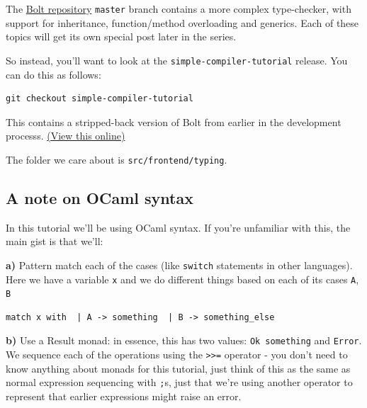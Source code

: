 {{The \href{https://github.com/mukul-rathi/bolt}{Bolt repository}
\texttt{master} branch contains a more complex type-checker, with
support for inheritance, function/method overloading and generics. Each
of these topics will get its own special post later in the series.

So instead, you'll want to look at the \texttt{simple-compiler-tutorial}
release. You can do this as follows:


\begin{verbatim}
git checkout simple-compiler-tutorial
\end{verbatim}

This contains a stripped-back version of Bolt from earlier in the
development processs.
\href{https://github.com/mukul-rathi/bolt/tree/simple-compiler-tutorial}{(View
this online)}

The folder we care about is \texttt{src/frontend/typing}.

\hypertarget{a-note-on-ocaml-syntax}{%
\subsection{\texorpdfstring{\protect\hyperlink{a-note-on-ocaml-syntax}{}A
note on OCaml
syntax}{A note on OCaml syntax}}\label{a-note-on-ocaml-syntax}}

In this tutorial we'll be using OCaml syntax. If you're unfamiliar with
this, the main gist is that we'll:

\textbf{a)} Pattern match each of the cases (like \texttt{switch}
statements in other languages). Here we have a variable \texttt{x} and
we do different things based on each of its cases \texttt{A}, \texttt{B}


\begin{lstlisting}[language=caml]
match x with  | A -> something  | B -> something_else
\end{lstlisting}

\textbf{b)} Use a Result monad: in essence, this has two values:
\texttt{Ok\ something} and \texttt{Error}. We sequence each of the
operations using the \texttt{\textgreater{}\textgreater{}=} operator -
you don't need to know anything about monads for this tutorial, just
think of this as the same as normal expression sequencing with
\texttt{;}s, just that we're using another operator to represent that
earlier expressions might raise an error.

\hypertarget{types-in-bolt}{%
}}}
